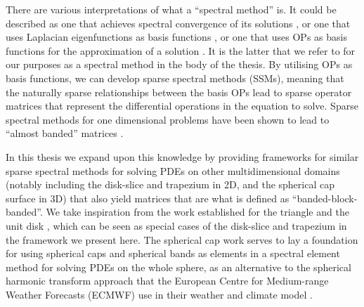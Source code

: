 There are various interpretations of what a \enquote{spectral method} is. It could be described as one that achieves spectral convergence of its solutions \cite{gottlieb1977numerical}, or one that uses Laplacian eigenfunctions as basis functions \cite{zhong2007numerical}, or one that uses OPs as basis functions for the approximation of a solution \cite{olver2019triangle}. It is the latter that we refer to for our purposes as a spectral method in the body of the thesis. By utilising OPs as basis functions, we can develop sparse spectral methods (SSMs), meaning that the naturally sparse relationships between the basis OPs lead to sparse operator matrices that represent the differential operations in the equation to solve. Sparse spectral methods for one dimensional problems have been shown to lead to \enquote{almost banded} matrices \cite{olver2013fast}.

In this thesis we expand upon this knowledge by providing frameworks for similar sparse spectral methods for solving PDEs on other multidimensional domains (notably including the disk-slice and trapezium in 2D, and the spherical cap surface in 3D) that also yield matrices that are what is defined as \enquote{banded-block-banded}. We take inspiration from the work established for the triangle \cite{olver2019triangle} and the unit disk \cite{vasil2016tensor}, which can  be seen as special cases of the disk-slice and trapezium in the framework we present here. The spherical cap work serves to lay a foundation for using spherical caps and spherical bands as elements in a spectral element method for solving PDEs on the whole sphere, as an alternative to the spherical harmonic transform approach that the European Centre for Medium-range Weather Forecasts (ECMWF) use in their weather and climate model \cite{cheong2006dynamical}. 

